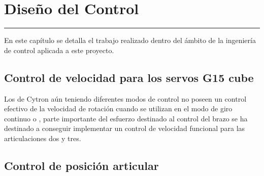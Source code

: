 \chapter{Diseño del Control} \label{chap:Control}
\hrule
\vspace{3mm}
En este capítulo se detalla el trabajo realizado dentro del ámbito de la ingeniería de control aplicada a este proyecto.

\section{Control de velocidad para los servos G15 cube} \label{sec:Control:velocidad_g15}

Los  de Cytron aún teniendo diferentes modos de control no poseen un control efectivo de la velocidad de rotación cuando se utilizan en el modo de giro continuo o , parte importante del esfuerzo destinado al control del brazo se ha destinado a conseguir implementar un control de velocidad funcional para las articulaciones dos y tres.

\section{Control de posición articular} \label{sec:Contorl:posicion_articular}
